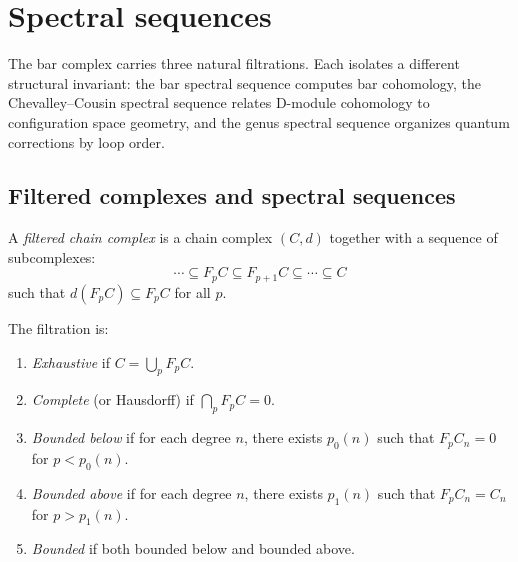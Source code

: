 \chapter{Spectral sequences}
\label{app:spectral-sequences}


The bar complex carries three natural filtrations. Each isolates a different
structural invariant: the bar spectral sequence computes bar cohomology, the
Chevalley--Cousin spectral sequence relates D-module cohomology to configuration
space geometry, and the genus spectral sequence organizes quantum corrections by
loop order.

\section{Filtered complexes and spectral sequences}
\label{sec:filtered-complexes}

\begin{definition}
\label{def:filtered-complex}
A \emph{filtered chain complex} is a chain complex $(C, d)$ together with a
sequence of subcomplexes:
\[
\cdots \subseteq F_p C \subseteq F_{p+1} C \subseteq \cdots \subseteq C
\]
such that $d(F_p C) \subseteq F_p C$ for all $p$.

The filtration is:
\begin{enumerate}[label=(\roman*)]
\item \emph{Exhaustive} if $C = \bigcup_p F_p C$.
\item \emph{Complete} (or Hausdorff) if $\bigcap_p F_p C = 0$.
\item \emph{Bounded below} if for each degree $n$, there exists $p_0(n)$
such that $F_p C_n = 0$ for $p < p_0(n)$.
\item \emph{Bounded above} if for each degree $n$, there exists $p_1(n)$
such that $F_p C_n = C_n$ for $p > p_1(n)$.
\item \emph{Bounded} if both bounded below and bounded above.
\end{enumerate}
\end{definition}

